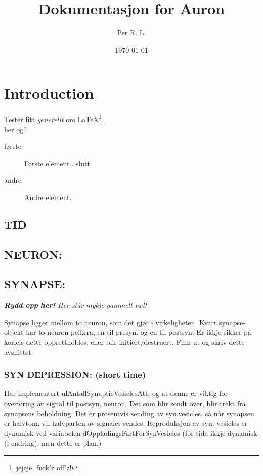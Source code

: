 \documentclass[norsk,9 pt]{report}
\title{Dokumentasjon for Auron}
\author{Per R. L.}
\date{\today}
\begin{document}
   



\chapter{Introduction}

Tester litt \emph{generellt} om \LaTeX \footnote{jejeje, fuck'z off'z!} \\
\- her og?
\begin{description}
\item[første] Første element..  slutt
\item[andre] Andre element.
\end{description}





\section{TID}

\section{NEURON:}


\section{SYNAPSE:}
\emph{\textbf{Rydd opp her!} Her står mykje gammelt ræl!}

Synapse ligger mellom to neuron, som det gjør i virkeligheten. Kvart synapse-objekt har to neuron-peikera, en til presyn. og en til postsyn.
Er ikkje sikker på korleis dette opprettholdes, eller blir initiert/destruert. Finn ut og skriv dette avsnittet.
	\subsection{SYN DEPRESSION: (short time)}
	Har implementert ulAntallSynapticVesiclesAtt, og at denne er viktig for overføring av signal til postsyn. neuron. Det som blir sendt over, blir 
	trekt fra synapsens beholdning. Det er prosentvis sending av syn.vesicles, så når synapsen er halvtom, vil halvparten av signalet sendes.
	Reproduksjon av syn. vesicles er dynamisk ved variabelen dOppladingsFartForSynVesicles (for tida ikkje dynamisk (i endring), men dette er plan.)
	
\end{document}
